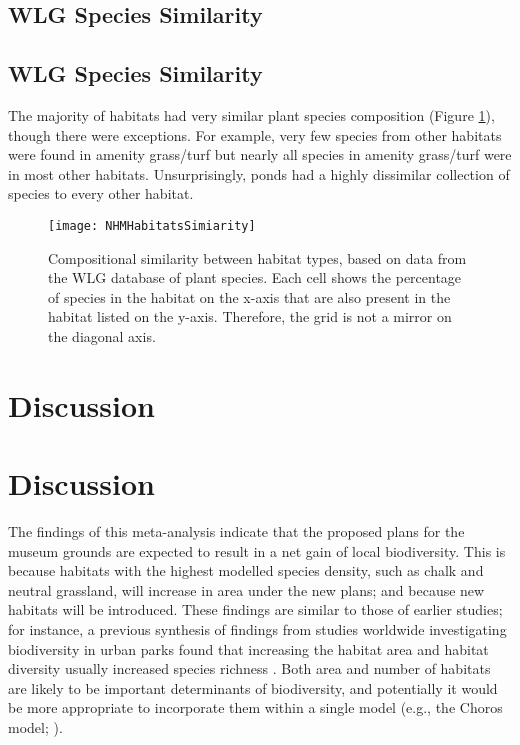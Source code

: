 \ifappendixStyle %
\subsection{WLG Species Similarity}%
\else
\subsection*{WLG Species Similarity}
\fi
The majority of habitats had very similar plant species composition (Figure \ref{fig:wlgsimilarity}), though there were exceptions. For example, very few species from other habitats were found in amenity grass/turf but nearly all species in amenity grass/turf were in most other habitats. Unsurprisingly, ponds had a highly dissimilar collection of species to every other habitat.


\begin{figure}[t]
	\centering
	\texttt{[image: NHMHabitatsSimiarity]}
	\caption{Compositional similarity between habitat types, based on data from the WLG database of plant species. Each cell shows the percentage of species in the habitat on the x-axis that are also present in the habitat listed on the y-axis. Therefore, the grid is not a mirror on the diagonal axis.}
   	 \label{fig:wlgsimilarity}
\end{figure}

\ifappendixStyle %
\section{Discussion}%
\else
\section*{Discussion}
\fi

The findings of this meta-analysis indicate that the proposed plans for the museum grounds are expected to result in a net gain of local biodiversity. This is because habitats with the highest modelled species density, such as chalk and neutral grassland, will increase in area under the new plans; and because new habitats will be introduced. These findings are similar to those of earlier studies; for instance, a previous synthesis of findings from studies worldwide investigating biodiversity in urban parks found that increasing the habitat area and habitat diversity usually increased species richness \citep{Nielsen:2014ue}. Both area and number of habitats are likely to be important determinants of biodiversity, and potentially it would be more appropriate to incorporate them within a single model (e.g., the Choros model; \citealt{Triantis:2003jb}).

